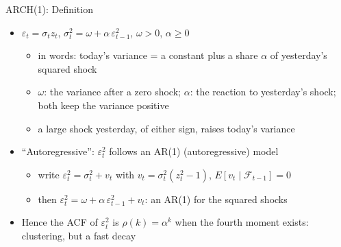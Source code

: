 \begin{frame}{ARCH(1): Definition}
\itemsize{\small}
\begin{itemize}
    \item $\varepsilon_t = \sigma_t z_t$, \quad $\sigma_t^2 = \omega + \alpha\,\varepsilon_{t-1}^2$, \quad $\omega > 0$, $\alpha \ge 0$
    \begin{itemize}
        \item in words: today's variance = a constant plus a share $\alpha$ of yesterday's squared shock
        \item $\omega$: the variance after a zero shock; $\alpha$: the reaction to yesterday's shock; both keep the variance positive
        \item a large shock yesterday, of either sign, raises today's variance
    \end{itemize}
    \item ``Autoregressive'': $\varepsilon_t^2$ follows an AR(1) (autoregressive) model
    \begin{itemize}
        \item write $\varepsilon_t^2 = \sigma_t^2 + v_t$ with $v_t = \sigma_t^2(z_t^2 - 1)$, $E[v_t \mid \mathcal{F}_{t-1}] = 0$
        \item then $\varepsilon_t^2 = \omega + \alpha\,\varepsilon_{t-1}^2 + v_t$: an AR(1) for the squared shocks
    \end{itemize}
    \item Hence the ACF of $\varepsilon_t^2$ is $\rho(k) = \alpha^k$ when the fourth moment exists: clustering, but a fast decay
\end{itemize}
\end{frame}

